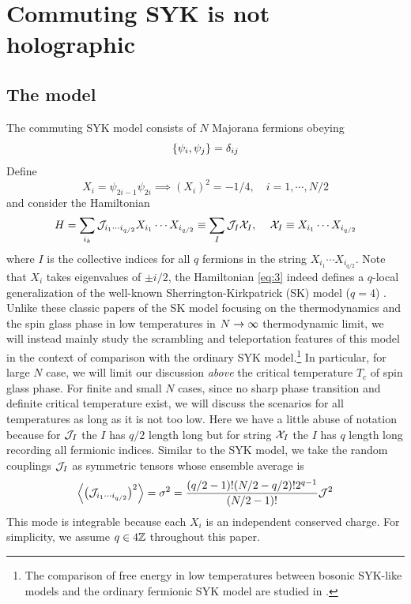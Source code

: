 \documentclass[11pt]{article}
\renewcommand{\>}{\rangle}
\newcommand{\<}{\langle}
\begin{document}
\section{Commuting SYK is not holographic} \label{sec2}

\subsection{The model}\label{sec2.1}

The commuting SYK model consists of $N$ Majorana fermions obeying 
\begin{equation}
\{\psi_{i},\psi_{j}\}=\delta_{ij}
\end{equation}
Define
\begin{equation}
X_{i}=\psi_{2i-1}\psi_{2i}\implies(X_{i})^{2}=-1/4,\quad i=1,\cdots,N/2
\end{equation}
and consider the Hamiltonian
\begin{equation}
H=\sum_{i_{k}}\mathcal{J}_{i_{1}\cdots i_{q/2}}X_{i_{1}}\cdots X_{i_{q/2}}\equiv\sum_{I}\mathcal{J}_{I}\mathcal{X}_{I},\quad\,\mathcal{X}_{I}\equiv X_{i_{1}}\cdots X_{i_{q/2}}\label{eq:3}
\end{equation}
where $I$ is the collective indices for all $q$ fermions in the
string $X_{i_{1}}\cdots X_{i_{q/2}}$. Note that $X_i$ takes eigenvalues of $\pm i/2$, the Hamiltonian \eqref{eq:3} indeed defines a $q$-local generalization \cite{derrida1980random, gardner1985spin, kirkpatrick1987dynamics} of the well-known Sherrington-Kirkpatrick (SK) model ($q=4$) \cite{sherrington1975solvable, thouless1977solution, parisi1979infinite}. Unlike these classic papers of the SK model focusing on the thermodynamics and the spin glass phase in low temperatures in $N\rightarrow\infty$ 
 thermodynamic limit, we will instead mainly study the scrambling and teleportation features of this model in the context of comparison with the ordinary SYK model.\footnote{The comparison of free energy in low temperatures between bosonic SYK-like models and the ordinary fermionic SYK model are studied in \cite{Baldwin:2019dki}.}  In particular, for large $N$ case, we will limit our discussion {\it above} the critical temperature $T_c$ of spin glass phase. For finite and small $N$ cases, since no sharp phase transition and definite critical temperature exist, we will discuss the scenarios for all temperatures as long as it is not too low. Here we have a little abuse
of notation because for $\mathcal{J}_{I}$ the $I$ has $q/2$ length long
but for string $\mathcal{X}_{I}$ the $I$ has $q$ length long recording
all fermionic indices. Similar to the SYK model, we take the random couplings
$\mathcal{J}_{I}$ as symmetric tensors whose ensemble average is 
\begin{equation}
\left\langle \left(\mathcal{J}_{i_{1}\cdots i_{q/2}}\right)^{2}\right\rangle=\sigma^{2}=\frac{(q/2-1)!(N/2-q/2)!2^{q-1}}{(N/2-1)!}\mathcal{J}^{2}\label{eq:4}
\end{equation}
This mode is integrable because each $X_{i}$ is an independent conserved
charge. For simplicity, we assume $q\in4\mathbb{Z}$ throughout this paper. 
\end{document}
